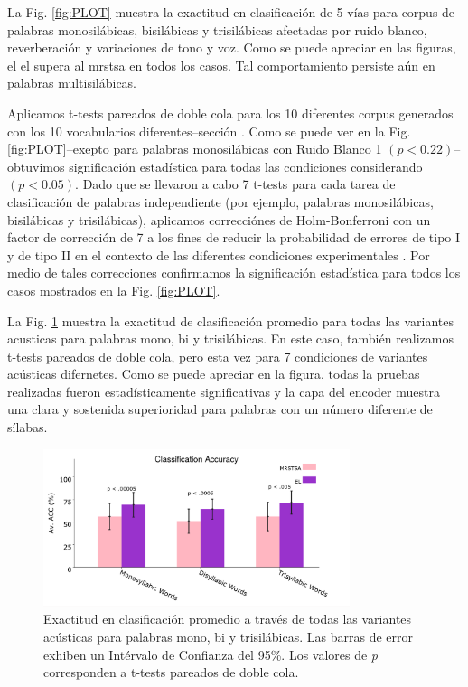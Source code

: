 La Fig. \ref{fig:PLOT} muestra la exactitud en clasificación de 5 vías para corpus de palabras monosilábicas, bisilábicas y trisilábicas afectadas por ruido blanco, reverberación y variaciones de tono y voz. Como se puede apreciar en las figuras, el \gls{el} supera al \gls{mrstsa} en todos los casos. Tal comportamiento persiste aún en palabras multisilábicas.

Aplicamos t-tests pareados de doble cola para los 10 diferentes corpus generados con los 10 vocabularios diferentes--sección . Como se puede ver en la Fig. \ref{fig:PLOT}--exepto para palabras monosilábicas con Ruido Blanco 1 $(p < 0.22)$--obtuvimos significación estadística para todas las condiciones considerando $(p<0.05)$. 
Dado que se llevaron a cabo 7 t-tests para cada tarea de clasificación de palabras independiente (por ejemplo, palabras monosilábicas, bisilábicas y trisilábicas), aplicamos correcciónes de Holm-Bonferroni con un factor de corrección de 7 a los fines de reducir la probabilidad de errores de tipo I y de tipo II en el contexto de las diferentes condiciones experimentales \cite{10.1093/biomet/75.2.383}. Por medio de tales correcciones confirmamos la significación estadística para todos los casos mostrados en la Fig. \ref{fig:PLOT}.

La Fig. \ref{fig:PLOT1} muestra la exactitud de clasificación promedio para todas las variantes acusticas para palabras mono, bi y trisilábicas.
En este caso, también realizamos t-tests pareados de doble cola, pero esta vez para 7 condiciones de variantes acústicas difernetes.
Como se puede apreciar en la figura, todas la pruebas realizadas fueron estadísticamente significativas  y la capa del encoder muestra una clara y sostenida superioridad para palabras con un número diferente de sílabas.

\begin{figure}[h!]
    \centering
    \includegraphics[width=0.8\textwidth]{PLOT1.png}
    \caption{Exactitud en clasificación promedio a través de todas las variantes acústicas para palabras mono, bi y trisilábicas. Las barras de error exhiben un Intérvalo de Confianza del 95\%. Los valores de \emph{p} corresponden a t-tests pareados de doble cola.}
    \label{fig:PLOT1}
\end{figure}



